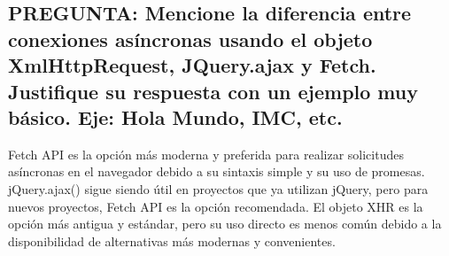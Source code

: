 	
	\subsection{PREGUNTA: Mencione la diferencia entre conexiones asíncronas usando el objeto XmlHttpRequest, JQuery.ajax
	y Fetch. Justifique su respuesta con un ejemplo muy básico. Eje: Hola Mundo, IMC, etc.}

	Fetch API es la opción más moderna y preferida para realizar solicitudes asíncronas en el navegador debido a su sintaxis simple y su uso de promesas. jQuery.ajax() sigue siendo útil en proyectos que ya utilizan jQuery, pero para nuevos proyectos, Fetch API es la opción recomendada. El objeto XHR es la opción más antigua y estándar, pero su uso directo es menos común debido a la disponibilidad de alternativas más modernas y convenientes.
	

\pagebreak